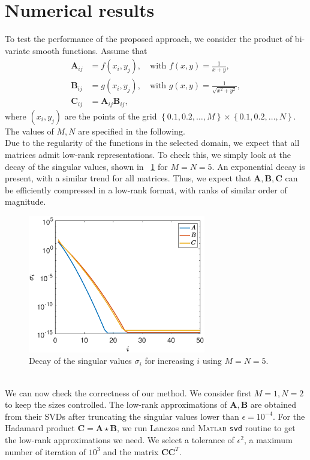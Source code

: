 \documentclass[10pt,titlepage]{article}
\numberwithin{equation}{section}
\numberwithin{figure}{section}
\newcommand{\hadamard}[2]{\mathbf{#1} \star \mathbf{#2}}
\newcommand{\figref}[1]{\figurename~\ref{#1}}
\begin{document}
\section{Numerical results}
To test the performance of the proposed approach, we consider the product of bi-variate smooth functions. Assume that
\begin{align}
	\mathbf{A}_{ij}&=f(x_i,y_j), \quad \text{with } f(x,y)=\frac{1}{x+y}, \\
	\mathbf{B}_{ij}&=g(x_i,y_j), \quad \text{with } g(x,y)=\frac{1}{\sqrt{x^2+y^2}}, \\
	\mathbf{C}_{ij}&=\mathbf{A}_{ij}\mathbf{B}_{ij},
\end{align}
where $(x_i,y_j)$ are the points of the grid $\left\lbrace 0.1,0.2,\dots,M \right\rbrace \times \left\lbrace 0.1,0.2,\dots,N \right\rbrace$. The values of $M,N$ are specified in the following. \\
Due to the regularity of the functions in the selected domain, we expect that all matrices admit low-rank representations. To check this, we simply look at the decay of the singular values, shown in \figref{fig:decay_sigma} for $M=N=5$. An exponential decay is present, with a similar trend for all matrices. Thus, we expect that $\mathbf{A},\mathbf{B},\mathbf{C}$ can be efficiently compressed in a low-rank format, with ranks of similar order of magnitude.
\begin{figure}[htbp]
	\centering
	\includegraphics[height=6cm]{./decay_sing_vals.eps}
	\caption{Decay of the singular values $\sigma_i$ for increasing $i$ using $M=N=5$.}
	\label{fig:decay_sigma}
\end{figure}%
\\
We can now check the correctness of our method. We consider first $M=1,N=2$ to keep the sizes controlled. The low-rank approximations of $\mathbf{A},\mathbf{B}$ are obtained from their SVDs after truncating the singular values lower than $\epsilon=10^{-4}$. For the Hadamard product $\mathbf{C}=\hadamard{A}{B}$, we run Lanczos and \textsc{Matlab} \texttt{svd} routine to get the low-rank approximations we need. We select a tolerance of $\epsilon^2$, a maximum number of iteration of $10^3$ and the matrix $\mathbf{C} \mathbf{C}^T$.
\end{document}

